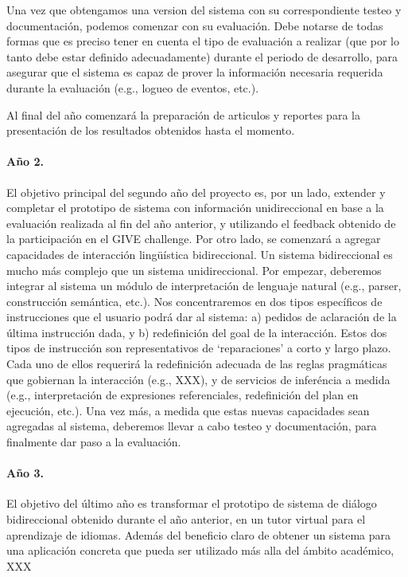 Una vez que obtengamos una version del sistema con su
correspondiente testeo y documentaci\'on, podemos comenzar con
su evaluaci\'on.  Debe notarse de todas formas que es preciso tener en cuenta
el tipo de evaluaci\'on a realizar (que por lo tanto debe estar definido
adecuadamente) durante el periodo de desarrollo, para asegurar que el sistema
es capaz de prover la informaci\'on necesaria requerida durante la evaluaci\'on
(e.g., logueo de eventos, etc.).

Al final del a\~no comenzar\'a la preparaci\'on de articulos y reportes para
la presentaci\'on de los resultados obtenidos hasta el momento.

\paragraph{A\~no 2.} El objetivo principal del segundo a\~no del proyecto es, 
por un lado, extender y completar el prototipo de sistema con informaci\'on 
unidireccional en base a la evaluaci\'on realizada al fin del a\~no anterior,  
y utilizando el feedback obtenido de la 
participaci\'on en el GIVE challenge.  Por otro lado, se comenzar\'a a agregar 
capacidades de interacci\'on ling\"u\'istica bidireccional.  Un sistema 
bidireccional es mucho m\'as complejo que un sistema unidireccional.  Por 
empezar, deberemos integrar al sistema un m\'odulo de interpretaci\'on de 
lenguaje natural (e.g., parser, construcci\'on sem\'antica, etc.).  Nos 
concentraremos en dos tipos espec\'ificos de instrucciones que el usuario 
podr\'a dar al sistema: a) pedidos de aclaraci\'on de la \'ultima 
instrucci\'on dada, y b) redefinici\'on del goal de la interacci\'on.  Estos 
dos tipos de instrucci\'on son representativos de `reparaciones' a corto y 
largo plazo.  Cada uno de ellos requerir\'a la redefinici\'on adecuada de 
las reglas pragm\'aticas que gobiernan la interacci\'on (e.g., XXX),  y de servicios 
de infer\'encia a medida (e.g., interpretaci\'on de expresiones referenciales, 
redefinici\'on del plan en ejecuci\'on, etc.).  Una vez m\'as, a medida que 
estas nuevas capacidades sean agregadas al sistema, deberemos llevar a 
cabo testeo y documentaci\'on, para finalmente dar paso a la evaluaci\'on. 



\paragraph{A\~no 3.} El objetivo del \'ultimo a\~no es transformar el prototipo 
de sistema de di\'alogo bidireccional obtenido durante el a\~no anterior, en un 
tutor virtual para el aprendizaje de idiomas.  Adem\'as del beneficio claro de 
obtener un sistema para una aplicaci\'on concreta que pueda ser utilizado 
m\'as alla del \'ambito acad\'emico, XXX 

